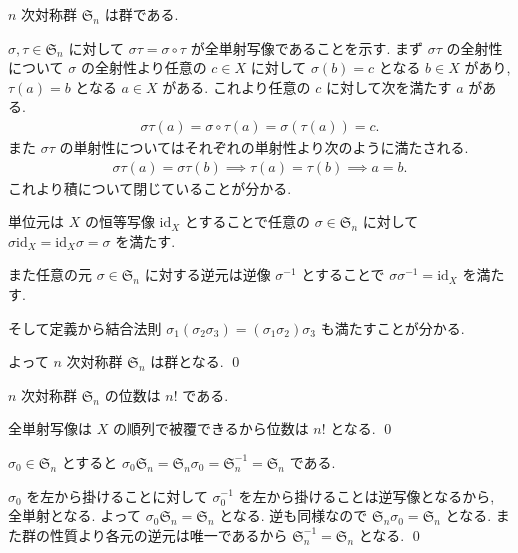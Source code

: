 \documentclass[uplatex,dvipdfmx,a4paper,11pt]{jlreq}
\makeatletter
\renewcommand{\SS}{\mathfrak{S}}
\newcommand{\id}{\mathrm{id}}
\numberwithin{equation}{section}
\theoremstyle{definition}
\renewenvironment{proof}[1][\proofname]{\par
  \normalfont
  \topsep6\p@\@plus6\p@ \trivlist
  \item[\hskip\labelsep{\bfseries #1}\@addpunct{\bfseries}]\ignorespaces\quad\par
}{%
  \qed\endtrivlist\@endpefalse
}
\renewcommand\proofname{証明}
\makeatother
\begin{document}
\begin{theorem}[Q21-3]
  $n$ 次対称群 $\SS_n$ は群である.
\end{theorem}
\begin{proof}
  $\sigma,\tau\in\SS_n$ に対して $\sigma\tau = \sigma\circ\tau$ が全単射写像であることを示す.
  まず $\sigma\tau$ の全射性について $\sigma$ の全射性より任意の $c\in X$ に対して $\sigma(b) = c$ となる $b\in X$ があり, $\tau(a) = b$ となる $a\in X$ がある.
  これより任意の $c$ に対して次を満たす $a$ がある.
  \begin{align}
    \sigma\tau(a) = \sigma\circ\tau(a) = \sigma(\tau(a)) = c.
  \end{align}
  また $\sigma\tau$ の単射性についてはそれぞれの単射性より次のように満たされる.
  \begin{align}
    \sigma\tau(a) = \sigma\tau(b) \implies \tau(a) = \tau(b) \implies a = b.
  \end{align}
  これより積について閉じていることが分かる.

  単位元は $X$ の恒等写像 $\id_X$ とすることで任意の $\sigma\in\SS_n$ に対して $\sigma\id_X = \id_X\sigma = \sigma$ を満たす.

  また任意の元 $\sigma\in\SS_n$ に対する逆元は逆像 $\sigma^{-1}$ とすることで $\sigma\sigma^{-1} = \id_X$ を満たす.

  そして定義から結合法則 $\sigma_1(\sigma_2\sigma_3) = (\sigma_1\sigma_2)\sigma_3$ も満たすことが分かる.

  よって $n$ 次対称群 $\SS_n$ は群となる.
\end{proof}

\begin{proposition}[Q21-4]
  $n$ 次対称群 $\SS_n$ の位数は $n!$ である.
\end{proposition}
\begin{proof}
  全単射写像は $X$ の順列で被覆できるから位数は $n!$ となる.
\end{proof}

\begin{proposition}[Q21-5, Q21-6]
  $\sigma_0\in\SS_n$ とすると $\sigma_0\SS_n = \SS_n\sigma_0 = \SS_n^{-1} = \SS_n$ である.
\end{proposition}
\begin{proof}
  $\sigma_0$ を左から掛けることに対して $\sigma_0^{-1}$ を左から掛けることは逆写像となるから, 全単射となる. よって $\sigma_0\SS_n = \SS_n$ となる. 逆も同様なので $\SS_n\sigma_0 = \SS_n$ となる.
  また群の性質より各元の逆元は唯一であるから $\SS_n^{-1} = \SS_n$ となる.
\end{proof}
\end{document}
